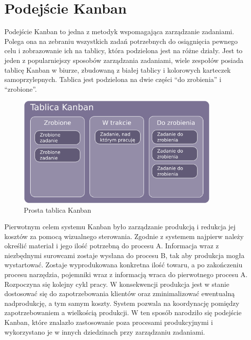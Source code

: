 \section{Podejście Kanban}

\indent 
Podejście Kanban to jedna z metodyk wspomagająca zarządzanie zadaniami. Polega ona na zebraniu wszystkich zadań potrzebnych do osiągnięcia pewnego celu i zobrazowanie ich na tablicy, która podzielona jest na różne działy. Jest to jeden z popularniejszy sposobów zarządzania zadaniami, wiele zespołów posiada tablicę Kanban w biurze, zbudowaną z białej tablicy i kolorowych karteczek samoprzylepnych. Tablica jest podzielona na dwie części “do zrobienia” i “zrobione”.
\begin{figure}[h]
	
	\centering
	\includegraphics[width=0.90\textwidth]{tablica_kanban}		
	 \caption{Prosta tablica Kanban}
\end{figure}


Pierwotnym celem systemu Kanban było zarządzanie produkcją i redukcja jej kosztów za pomocą wizualnego sterowania. Zgodnie z systemem najpierw należy określić materiał i jego ilość potrzebną do procesu A. Informacja wraz z niezbędnymi surowcami zostaje wysłana do procesu B, tak aby produkcja mogła wystartować. Zostaje wyprodukowana konkretna ilość towaru, a po zakończeniu procesu narzędzia, pojemniki wraz z informacją  wraca do pierwotnego procesu A. Rozpoczyna  się kolejny cykl pracy. W konsekwencji produkcja jest w stanie dostosować się do zapotrzebowania klientów oraz zminimalizować ewentualną nadprodukcję, a tym samym koszty. System pozwala na koordynację pomiędzy zapotrzebowaniem a wielkością produkcji. W ten sposób narodziło się podejście Kanban, które znalazło zastosowanie poza procesami produkcyjnymi i wykorzystano je w innych dziedzinach przy zarządzaniu zadaniami.


